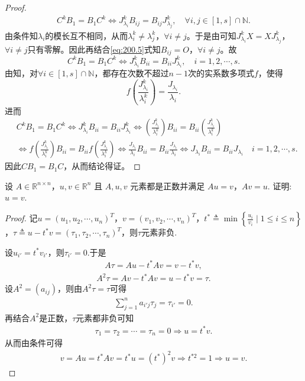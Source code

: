 \documentclass[../../main.tex]{subfiles}
\begin{document}
\begin{proof}
\begin{align}
C^k B_1 = B_1 C^k \Longleftrightarrow J_{\lambda_i}^k B_{ij} = B_{ij} J_{\lambda_j}^k, \quad \forall i,j \in [1,s] \cap \mathbb{N}.
\label{eq:200.5}
\end{align}
由条件知$\lambda_i$的模长互不相同，从而$\lambda_i^k \ne \lambda_j^k$，$\forall i \ne j$。于是由可知$J_{\lambda_i}^k X = X J_{\lambda_j}^k$，$\forall i \ne j$只有零解。因此再结合\eqref{eq:200.5}式知$B_{ij} = O$，$\forall i \ne j$。故
\[
C^k B_1 = B_1 C^k \Longleftrightarrow J_{\lambda_i}^k B_{ii} = B_{ii} J_{\lambda_i}^k, \quad i = 1,2,\cdots,s.
\]
由知，对$\forall i \in [1,s] \cap \mathbb{N}$，都存在次数不超过$n - 1$次的实系数多项式$f$，使得
\[
f\left( \frac{J_{\lambda_i}^k}{\lambda_i^k} \right) = \frac{J_{\lambda_i}}{\lambda_i}.
\]
进而
\begin{align*}
&C^k B_1 = B_1 C^k \Longleftrightarrow J_{\lambda_i}^k B_{ii} = B_{ii} J_{\lambda_i}^k \Longleftrightarrow \left( \frac{J_{\lambda_i}^k}{\lambda_i^k} \right) B_{ii} = B_{ii} \left( \frac{J_{\lambda_i}^k}{\lambda_i^k} \right)
\\
&\Longleftrightarrow f\left( \frac{J_{\lambda_i}^k}{\lambda_i^k} \right) B_{ii} = B_{ii} f\left( \frac{J_{\lambda_i}^k}{\lambda_i^k} \right) 
\Longleftrightarrow \frac{J_{\lambda_i}}{\lambda_i} B_{ii} = B_{ii} \frac{J_{\lambda_i}}{\lambda_i} \Longleftrightarrow J_{\lambda_i} B_{ii} = B_{ii} J_{\lambda_i} \quad i = 1,2,\cdots,s.
\end{align*}
因此$C B_1 = B_1 C$，从而结论得证。
\end{proof}

\begin{example}
设 \( A \in \mathbb{R}^{n \times n} \)，\( u, v \in \mathbb{R}^n \) 且 \( A, u, v \) 元素都是正数并满足 \( Au = v \)，\( Av = u \). 证明: \( u = v \).
\end{example}
\begin{proof}
记$u=(u_1,u_2,\cdots,u_n)^T$，$v=(v_1,v_2,\cdots,v_n)^T$，$t^*\triangleq\min\left\{\frac{u_i}{v_i}\mid 1\leqslant i\leqslant n\right\}$，$\tau\triangleq u-t^*v=(\tau_1,\tau_2,\cdots,\tau_n)^T$，则$\tau$元素非负.

设$u_{i'}=t^*v_{i'}$，则$\tau_{i'}=0$.于是
\begin{align*}
A\tau=Au-t^*Av=v-t^*v,
\end{align*}
\begin{align*}
A^2\tau=Av-t^*Av=u-t^*v=\tau.
\end{align*}
设$A^2=(a_{ij})$，则由$A^2\tau=\tau$可得
\begin{align*}
\sum_{j=1}^n a_{i'j}\tau_j=\tau_{i'}=0.
\end{align*}
再结合$A^2$是正数，$\tau$元素都非负可知
\begin{align*}
\tau_1=\tau_2=\cdots=\tau_n=0\Longrightarrow u=t^*v.
\end{align*}
从而由条件可得
\begin{align*}
v=Au=t^*Av=t^*u=(t^*)^2v\Longrightarrow t^{*2}=1\Longrightarrow u=v.
\end{align*}
\end{proof}
\end{document}
